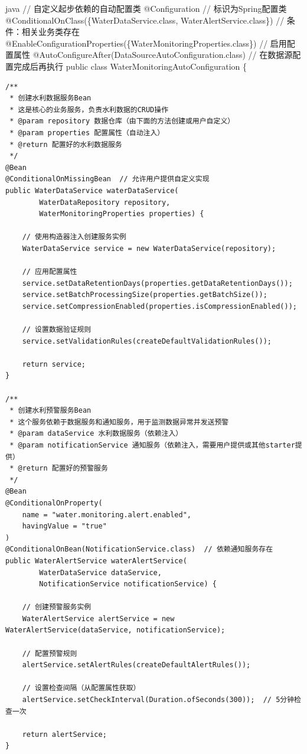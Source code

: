 java // 自定义起步依赖的自动配置类 @Configuration // 标识为Spring配置类 @ConditionalOnClass(\{WaterDataService.class, WaterAlertService.class\}) // 条件：相关业务类存在 @EnableConfigurationProperties(\{WaterMonitoringProperties.class\}) // 启用配置属性 @AutoConfigureAfter(DataSourceAutoConfiguration.class) // 在数据源配置完成后再执行 public class WaterMonitoringAutoConfiguration \{

\begin{verbatim}
/**
 * 创建水利数据服务Bean
 * 这是核心的业务服务，负责水利数据的CRUD操作
 * @param repository 数据仓库（由下面的方法创建或用户自定义）
 * @param properties 配置属性（自动注入）
 * @return 配置好的水利数据服务
 */
@Bean
@ConditionalOnMissingBean  // 允许用户提供自定义实现
public WaterDataService waterDataService(
        WaterDataRepository repository,
        WaterMonitoringProperties properties) {
    
    // 使用构造器注入创建服务实例
    WaterDataService service = new WaterDataService(repository);
    
    // 应用配置属性
    service.setDataRetentionDays(properties.getDataRetentionDays());
    service.setBatchProcessingSize(properties.getBatchSize());
    service.setCompressionEnabled(properties.isCompressionEnabled());
    
    // 设置数据验证规则
    service.setValidationRules(createDefaultValidationRules());
    
    return service;
}

/**
 * 创建水利预警服务Bean
 * 这个服务依赖于数据服务和通知服务，用于监测数据异常并发送预警
 * @param dataService 水利数据服务（依赖注入）
 * @param notificationService 通知服务（依赖注入，需要用户提供或其他starter提供）
 * @return 配置好的预警服务
 */
@Bean
@ConditionalOnProperty(
    name = "water.monitoring.alert.enabled", 
    havingValue = "true"
)
@ConditionalOnBean(NotificationService.class)  // 依赖通知服务存在
public WaterAlertService waterAlertService(
        WaterDataService dataService,
        NotificationService notificationService) {
    
    // 创建预警服务实例
    WaterAlertService alertService = new WaterAlertService(dataService, notificationService);
    
    // 配置预警规则
    alertService.setAlertRules(createDefaultAlertRules());
    
    // 设置检查间隔（从配置属性获取）
    alertService.setCheckInterval(Duration.ofSeconds(300));  // 5分钟检查一次
    
    return alertService;
}


\end{verbatim}
